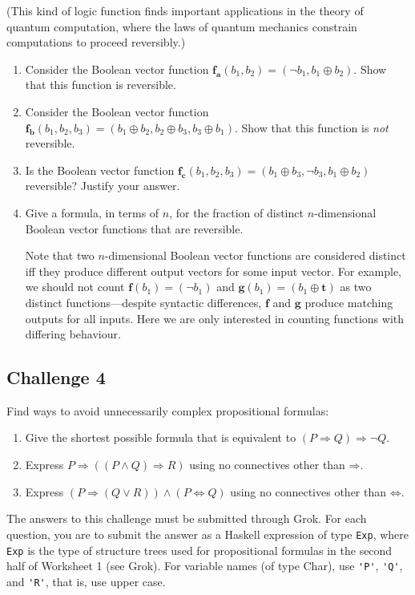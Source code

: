 \documentclass[12pt]{article}
\newcommand{\impl}{\mathbin{\Rightarrow}}
\newcommand{\biim}{\mathbin{\Leftrightarrow}}
\begin{document}
(This kind of logic function finds important applications in
the theory of quantum computation, where the laws of quantum
mechanics constrain computations to proceed reversibly.)

\begin{enumerate}
\item
Consider the Boolean vector function
$\bm{f_a}(b_1, b_2) = (\neg b_1, b_1 \oplus b_2)$.
Show that this function is reversible.

\item
Consider the Boolean vector function
$\bm{f_b}(b_1, b_2, b_3)
  = (b_1 \oplus b_2, b_2 \oplus b_3, b_3 \oplus b_1)$.
Show that this function is \emph{not} reversible.

\item
Is the Boolean vector function 
$\bm{f_c}(b_1, b_2, b_3)
  = (b_1 \oplus b_3, \neg b_3, b_1 \oplus b_2)$
reversible?
Justify your answer.

\item
Give a formula, in terms of $n$, for the fraction of distinct
$n$-dimensional Boolean vector functions that are reversible.

Note that two $n$-dimensional Boolean vector functions are
considered distinct iff they produce different output vectors
for some input vector. For example, we should not count
$\bm{f}(b_1) = (\neg b_1)$ and
$\bm{g}(b_1) = (b_1 \oplus \mathbf{t})$
as two distinct functions---despite syntactic differences,
$\bm{f}$ and $\bm{g}$ produce matching outputs for all inputs.
Here we are only interested in counting functions with
differing behaviour.
\end{enumerate}

\subsection*{Challenge 4}

Find ways to avoid unnecessarily complex propositional formulas:
\begin{enumerate}
\setlength{\itemsep}{-0.5ex}
\item 
Give the shortest possible formula that is equivalent to
$(P \impl Q) \impl \neg Q$.
\item 
Express $P \impl ((P \land Q) \impl R)$
using no connectives other than $\impl$.
\item 
Express $(P \impl (Q \lor R)) \land (P \biim Q)$
using no connectives other than $\biim$.
\end{enumerate}
The answers to this challenge must be submitted through Grok.
For each question, you are to submit the answer as a Haskell
expression of type \verb!Exp!, where \verb!Exp! is the type
of structure trees used for propositional formulas
in the second half of Worksheet 1 (see Grok).
For variable names (of type Char), use \verb!'P'!, \verb!'Q'!, and 
\verb!'R'!, that is, use upper case.
\end{document}
